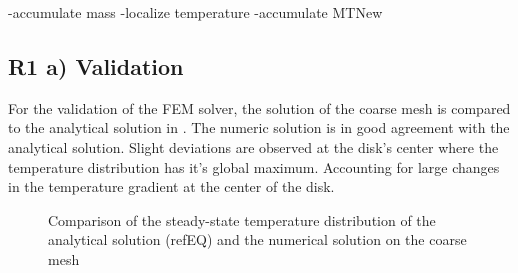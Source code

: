 -accumulate mass
-localize temperature
-accumulate MTNew

\subsection{R1 a) Validation}
For the validation of the FEM solver, the solution of the coarse mesh is compared to the analytical solution in . The numeric solution is in good agreement with the analytical solution. Slight deviations are observed at the disk's center where the temperature distribution has it's global maximum. Accounting for large changes in the temperature gradient at the center of the disk. 

\begin{figure}[!htbp]
	\centering
	\leavevmode
	\resizebox{0.8\width}{!}{}
	\caption{Comparison of the steady-state temperature distribution of the analytical solution (refEQ) and the numerical solution on the coarse mesh}
	\label{fig::TemperatureDist}
\end{figure}
